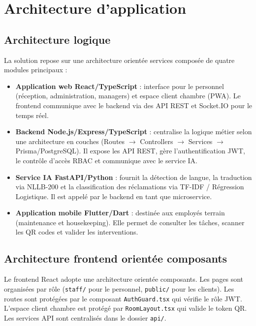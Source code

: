 \section{Architecture d'application}

\subsection{Architecture logique}
La solution repose sur une architecture orientée services composée de quatre modules principaux :
\begin{itemize}
    \item \textbf{Application web React/TypeScript} : interface pour le personnel (réception, administration, managers) et espace client chambre (PWA). Le frontend communique avec le backend via des API REST et Socket.IO pour le temps réel.
    \item \textbf{Backend Node.js/Express/TypeScript} : centralise la logique métier selon une architecture en couches (Routes $\rightarrow$ Controllers $\rightarrow$ Services $\rightarrow$ Prisma/PostgreSQL). Il expose les API REST, gère l'authentification JWT, le contrôle d'accès RBAC et communique avec le service IA.
    \item \textbf{Service IA FastAPI/Python} : fournit la détection de langue, la traduction via NLLB-200 et la classification des réclamations via TF-IDF / Régression Logistique. Il est appelé par le backend en tant que microservice.
    \item \textbf{Application mobile Flutter/Dart} : destinée aux employés terrain (maintenance et housekeeping). Elle permet de consulter les tâches, scanner les QR codes et valider les interventions.
\end{itemize}


\subsection{Architecture frontend orientée composants}
Le frontend React adopte une architecture orientée composants. Les pages sont organisées par rôle (\texttt{staff/} pour le personnel, \texttt{public/} pour les clients). Les routes sont protégées par le composant \texttt{AuthGuard.tsx} qui vérifie le rôle JWT. L'espace client chambre est protégé par \texttt{RoomLayout.tsx} qui valide le token QR. Les services API sont centralisés dans le dossier \texttt{api/}.

